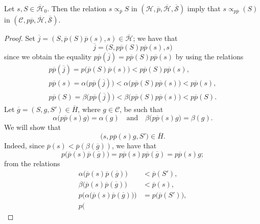 \documentclass[a4paper,fleqn]{article}
\theoremstyle{plain}
\newenvironment{proposition}[1]
  {\renewcommand\theinnerproposition{#1}\innerproposition}
  {\endinnerproposition}
\theoremstyle{definition}
\newcommand{\oldpage}[1]{{\marginpar{\footnotesize$\bigg\vert$\,\,\,\,\textit{p.~#1}}}}
\newcommand{\textand}{\quad\text{and}\quad}
\newcommand{\CC}{\mathcal{C}}
\newcommand{\HH}{\mathcal{H}}
\newcommand{\bHH}{\overline{\HH}}
\renewcommand{\SS}{\mathcal{S}}
\newcommand{\bSS}{\overline{\SS}}
\newcommand{\subs}{\mathrel{\propto}}
\begin{document}
\begin{proposition}{13}
\label{proposition:i-13}
  Let $s,S\in\bHH_0$.
  Then the relation $s\subs_{\overline{p}}S$ in $(\HH,\overline{p},\bHH,\bSS)$ imply that $s\subs_{p\overline{p}}(S)$ in $(\CC,p\overline{p},\bHH,\bSS)$.
\end{proposition}

\begin{proof}
  Set $\overline{j}=(S,\overline{p}(S)\overline{p}(s),s)\in\bHH$;
  we have that
  \[
    \overline{j}
    = \big(
      S, p\overline{p}(S)p\overline{p}(s), s
    \big)
  \]
  since we obtain the equality $p\overline{p}(\overline{j})=p\overline{p}(S)p\overline{p}(s)$ by using the relations
  \[
    \begin{gathered}
      p\overline{p}(\overline{j})
      = p\big(
        \overline{p}(S)\overline{p}(s)
      \big)
      < p\overline{p}(S)p\overline{p}(s),
    \\p\overline{p}(s)
      = \alpha\big(
        p\overline{p}(\overline{j})
      \big)
      < \alpha\big(
        p\overline{p}(S)p\overline{p}(s)
      \big)
      < p\overline{p}(s),
    \\p\overline{p}(S)
      = \beta\big(
        p\overline{p}(\overline{j})
      \big)
      < \beta\big(
        p\overline{p}(S)p\overline{p}(s)
      \big)
      < p\overline{p}(S).
    \end{gathered}
  \]
  Let $\overline{g}=(S,g,S')\in\overline{H}$, where $g\in\CC$, be such that
  \[
    \alpha\big(
      p\overline{p}(s)g
    \big) = \alpha(g)
    \textand
    \beta\big(
      p\overline{p}(s)g
    \big) = \beta(g).
  \]
  We will show that
  \[
    \big(
      s, p\overline{p}(s)g, S'
    \big)
    \in\overline{H}.
  \]
  \oldpage{375}
  Indeed, since $\overline{p}(s)<\overline{p}(\beta(\overline{g}))$, we have that
  \[
    p\big(
      \overline{p}(s)\overline{p}(\overline{g})
    \big)
    = p\overline{p}(s)p\overline{p}(\overline{g})
    = p\overline{p}(s)g;
  \]
  from the relations
  \[
    \begin{aligned}
      \alpha\big(
        \overline{p}(s)\overline{p}(\overline{g})
      \big)
      &< \overline{p}(S'),
    \\\beta\big(
        \overline{p}(s)\overline{p}(\overline{g})
      \big)
      &< \overline{p}(s),
    \\p\big(
        \alpha\big(
          \overline{p}(s)\overline{p}(\overline{g})
        \big)
      \big)
      &= p\big(
        \overline{p}(S')
      \big),
    \\p\big(

\end{aligned}\]
\end{proof}
\end{document}
